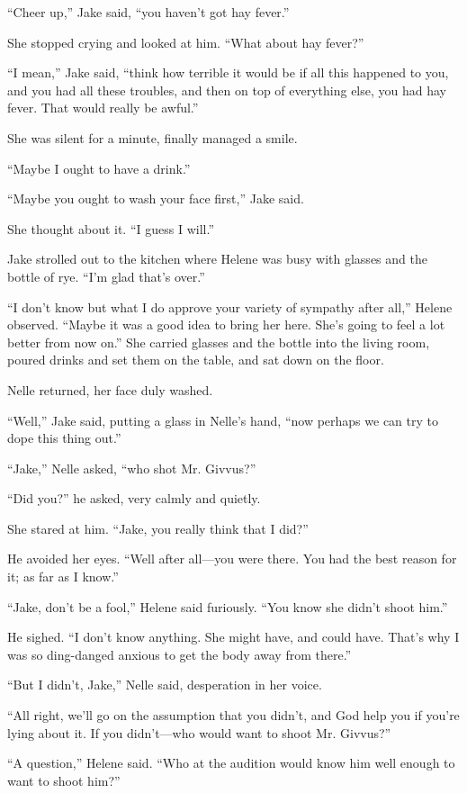 \documentclass{novel}
\begin{document}
“Cheer up,” Jake said, “you haven’t got hay fever.”

She stopped crying and looked at him. “What about hay fever?”

“I mean,” Jake said, “think how terrible it would be if all this happened to you, and you had all these troubles, and then on top of everything else, you had hay fever. That would really be awful.”

She was silent for a minute, finally managed a smile.

“Maybe I ought to have a drink.”

“Maybe you ought to wash your face first,” Jake said.

She thought about it. “I guess I will.”

Jake strolled out to the kitchen where Helene was busy with glasses and the bottle of rye. “I’m glad that’s over.”

“I don’t know but what I do approve your variety of sympathy after all,” Helene observed. “Maybe it was a good idea to bring her here. She’s going to feel a lot better from now on.” She carried glasses and the bottle into the living room, poured drinks and set them on the table, and sat down on the floor.

Nelle returned, her face duly washed.

“Well,” Jake said, putting a glass in Nelle’s hand, “now perhaps we can try to dope this thing out.”

“Jake,” Nelle asked, “who shot Mr. Givvus?”

“Did you?” he asked, very calmly and quietly.

She stared at him. “Jake, you really think that I did?”

He avoided her eyes. “Well after all—you were there. You had the best reason for it; as far as I know.”

“Jake, don’t be a fool,” Helene said furiously. “You know she didn’t shoot him.”

He sighed. “I don’t know anything. She might have, and could have. That’s why I was so ding-danged anxious to get the body away from there.”

“But I didn’t, Jake,” Nelle said, desperation in her voice.

“All right, we’ll go on the assumption that you didn’t, and God help you if you’re lying about it. If you didn’t—who would want to shoot Mr. Givvus?”

“A question,” Helene said. “Who at the audition would know him well enough to want to shoot him?”
\end{document}
